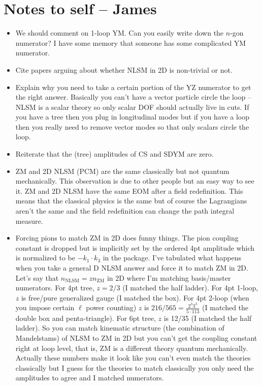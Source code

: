\documentclass[11pt,letter]{article}
\begin{document}
\section{Notes to self -- James}
\begin{itemize}
\item We should comment on 1-loop YM.  Can you easily write down the $n$-gon numerator?  I have some memory that someone has some complicated YM numerator.
\item Cite papers arguing about whether NLSM in 2D is non-trivial or not.
\item Explain why you need to take a certain portion of the YZ numerator to get the right answer.  Basically you can't have a vector particle circle the loop -- NLSM is a scalar theory so only scalar DOF should actually live in cuts.  If you have a tree then you plug in longitudinal modes but if you have a loop then you really need to remove vector modes so that only scalars circle the loop.
\item Reiterate that the (tree) amplitudes of CS and SDYM are zero.
\item ZM and 2D NLSM (PCM) are the same classically but not quantum mechanically.
This observation is due to other people but an easy way to see it.
ZM and 2D NLSM have the same EOM after a field redefinition.
This means that the classical physics is the same but of course the Lagrangians aren't the same and the field redefinition can change the path integral measure.
\item Forcing pions to match ZM in 2D does funny things.
The pion coupling constant is dropped but is implicitly set by the ordered 4pt amplitude which is normalized to be $-k_1 \cdot k_3$ in the package.
I've tabulated what happens when you take a general D NLSM answer and force it to match ZM in 2D.
Let's say that $n_\text{NLSM} = z n_\text{ZM}$ in 2D where I'm matching basis/master numerators.
For 4pt tree, $z=2/3$ (I matched the half ladder).
For 4pt 1-loop, $z$ is free/pure generalized gauge (I matched the box).
For 4pt 2-loop (when you impose certain $\ell$ power counting) $z$ is $216/565=\tfrac{2^3 3^3}{5 \cdot 113}$ (I matched the double box and penta-triangle).
For 6pt tree, $z$ is 12/35 (I matched the half ladder).
So you can match kinematic structure (the combination of Mandelstams) of NLSM to ZM in 2D but you can't get the coupling constant right at loop level, that is, ZM is a different theory quantum mechanically.
Actually these numbers make it look like you can't even match the theories classically but I guess for the theories to match classically you only need the amplitudes to agree and I matched numerators.

\end{itemize}
\end{document}
